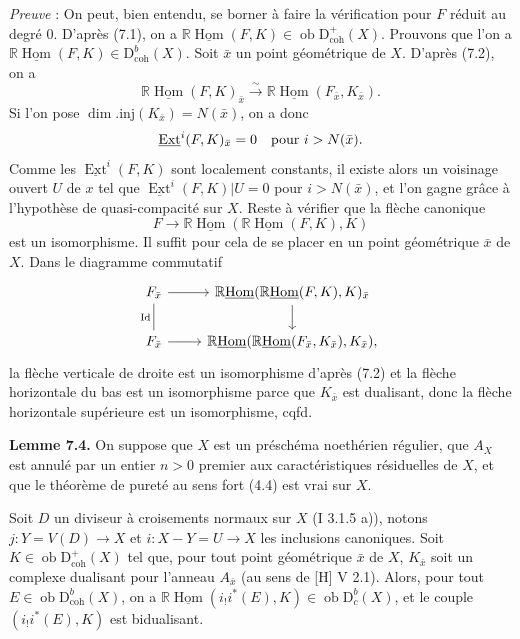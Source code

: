 \documentclass[11pt]{article}
\DeclareMathOperator{\Hom}{Hom}
\DeclareMathOperator{\Ext}{Ext}
\newcommand{\R}{\mathbb{R}}\newcommand{\RHomCore}{\mathbb{R}\mathrm{Hom}}
\newcommand{\D}{\mathrm{D}}
\newcommand{\ob}{\operatorname{ob}}
\providecommand{\Hom}{\operatorname{Hom}}
\providecommand{\ob}{\operatorname{ob}}
\providecommand{\R}{\mathrm R}
\providecommand{\Hom}{\operatorname{Hom}}
\begin{document}
\emph{Preuve} : On peut, bien entendu, se borner à faire la vérification pour $F$ réduit au degré $0$. D'après (7.1), on a $\R\underline{\Hom}(F,K)\in\ob\D^{+}_{\mathrm{coh}}(X)$. Prouvons que l'on a $\R\underline{\Hom}(F,K)\in\D^{b}_{\mathrm{coh}}(X)$. Soit $\bar{x}$ un point géométrique de $X$. D'après (7.2), on a
\[
        \R\underline{\Hom}(F,K)_{\bar{x}}\xrightarrow{\sim} \R\underline{\Hom}(F_{\bar{x}},K_{\bar{x}}).
\]
Si l'on pose $\dim.\mathrm{inj}(K_{\bar{x}})=N(\bar{x})$, on a donc
\[
        \underline{\Ext}^i(F,K)_{\bar{x}}=0\quad\hbox{pour }i>N(\bar{x}).
\]
Comme les $\underline{\Ext}^{i}(F,K)$ sont localement constants, il existe alors un voisinage ouvert $U$ de $x$ tel que $\underline{\Ext}^{i}(F,K)|U=0$ pour $i>N(\bar{x})$, et l'on gagne grâce à l'hypothèse de quasi-compacité sur $X$. Reste à vérifier que la flèche canonique
\[
        F\longrightarrow \R\underline{\Hom}(\R\underline{\Hom}(F,K),K)
\]
est un isomorphisme. Il suffit pour cela de se placer en un point géométrique $\bar{x}$ de $X$. Dans le diagramme commutatif
\[
\begin{tikzcd}
F_{\bar{x}} \arrow[r] \arrow[d,dash,"\mathrm{Id}"'] & \R\underline{\Hom}(\R\underline{\Hom}(F,K),K)_{\bar{x}} \arrow[d]\\
F_{\bar{x}} \arrow[r] & \R\underline{\Hom}(\R\underline{\Hom}(F_{\bar{x}},K_{\bar{x}}),K_{\bar{x}}),
\end{tikzcd}
\]
la flèche verticale de droite est un isomorphisme d'après (7.2) et la flèche horizontale du bas est un isomorphisme parce que $K_{\bar{x}}$ est dualisant, donc la flèche horizontale supérieure est un isomorphisme, cqfd.

\textbf{Lemme 7.4.} On suppose que $X$ est un préschéma noethérien régulier, que $A_X$ est annulé par un entier $n>0$ premier aux caractéristiques résiduelles 
de $X$, et que le théorème de
pureté au sens fort (4.4) est vrai sur $X$.

Soit $D$ un diviseur à croisements normaux sur $X$ (I 3.1.5 a)), notons $j:Y=V(D)\to X$ et $i:X-Y=U\to X$ les inclusions canoniques. Soit $K\in\ob\D^{+}_{\mathrm{coh}}(X)$ tel que, pour tout point géométrique $\bar{x}$ de $X$, $K_{\bar{x}}$ soit un complexe dualisant pour l'anneau $A_{\bar{x}}$ (au sens de [H] V 2.1). Alors, pour tout $E\in\ob\D^{b}_{\mathrm{coh}}(X)$, on a $\R\underline{\Hom}(i_!i^*(E),K)\in\ob\D^{b}_{c}(X)$, et le couple $(i_!i^*(E),K)$ est bidualisant.
\end{document}
